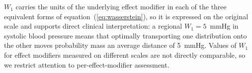 \documentclass[AMA,Times1COL]{WileyNJDv5}
\begin{document}
$W_1$ carries the units of the underlying effect modifier in each of the three equivalent forms of equation~(\ref{eq:wasserstein}), so it is expressed on the original scale and supports direct clinical interpretation: a regional $W_1 = 5$~mmHg in systolic blood pressure means that optimally transporting one distribution onto the other moves probability mass an average distance of 5~mmHg. Values of $W_1$ for effect modifiers measured on different scales are not directly comparable, so we restrict attention to per-effect-modifier assessment.
\end{document}
